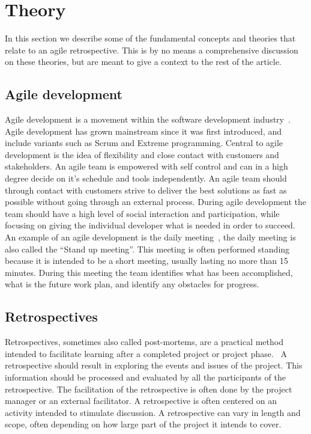 \documentclass[12pt]{article}
\begin{document}
\section{Theory}
In this section we describe some of the fundamental concepts and theories that relate to an agile retrospective. This is by no means a comprehensive discussion on these theories, but are meant to give a context to the rest of the article. 

\subsection{Agile development}
Agile development is a movement within the software development industry~\cite{Tessem2014}. Agile development has grown mainstream since it was first introduced, and include variants such as Scrum and Extreme programming. Central to agile development is the idea of flexibility and close contact with customers and stakeholders. An agile team is empowered with self control and can in a high degree decide on it's schedule and tools independently. An agile team should through contact with customers strive to deliver the best solutions as fast as possible without going through an external process. During agile development the team should have a high level of social interaction and participation, while focusing on giving the individual developer what is needed in order to succeed. An example of an agile development is the daily meeting~\cite{Stray2012}, the daily meeting is also called the ``Stand up meeting''. This meeting is often performed standing because it is intended to be a short meeting, usually lasting no more than 15 minutes. During this meeting the team identifies what has been accomplished, what is the future work plan, and identify any obstacles for progress.

\subsection{Retrospectives}
Retrospectives, sometimes also called post-mortems, are a practical method intended to facilitate learning after a completed project or project phase.~\cite{Dingsoyr2005} A retrospective should result in exploring the events and issues of the project. This information should be processed and evaluated by all the participants of the retrospective. The facilitation of the retrospective is often done by the project manager or an external facilitator. A retrospective is often centered on an activity intended to stimulate discussion. A retrospective can vary in length and scope, often depending on how large part of the project it intends to cover.
\end{document}
